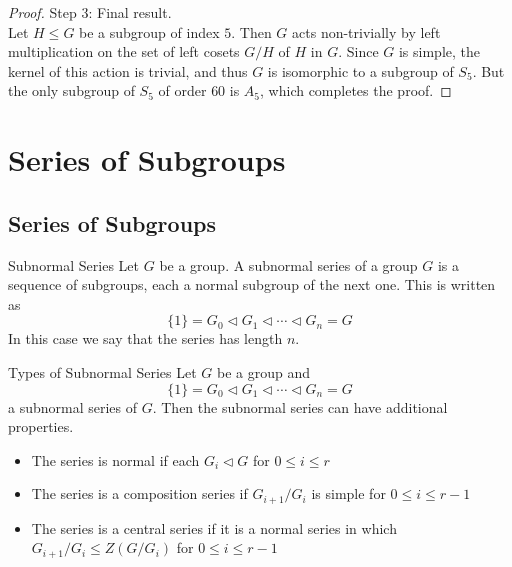 \documentclass[a4paper]{article}
\begin{document}
\begin{thm}{}{}
\begin{proof}
Step 3: Final result. \\
Let $H\leq G$ be a subgroup of index $5$. Then $G$ acts non-trivially by left multiplication on the set of left cosets $G/H$ of $H$ in $G$. Since $G$ is simple, the kernel of this action is trivial, and thus $G$ is isomorphic to a subgroup of $S_5$. But the only subgroup of $S_5$ of order $60$ is $A_5$, which completes the proof. 
\end{proof}
\end{thm}


\pagebreak
\section{Series of Subgroups}
\subsection{Series of Subgroups}
\begin{defn}{Subnormal Series}{} Let $G$ be a group. A subnormal series  of a group $G$ is a sequence of subgroups, each a normal subgroup of the next one. This is written as $$\{1\}=G_0\triangleleft G_1\triangleleft\cdots\triangleleft G_n=G$$ In this case we say that the series has length $n$. 
\end{defn}

\begin{defn}{Types of Subnormal Series}{} Let $G$ be a group and $$\{1\}=G_0\triangleleft G_1\triangleleft\cdots\triangleleft G_n=G$$ a subnormal series of $G$. Then the subnormal series can have additional properties. 
\begin{itemize}
\item The series is normal if each $G_i\triangleleft G$ for $0\leq i\leq r$
\item The series is a composition series if $G_{i+1}/G_i$ is simple for  $0\leq i\leq r-1$
\item The series is a central series if it is a normal series in which $G_{i+1}/G_i\leq Z(G/G_i)$ for  $0\leq i\leq r-1$
\end{itemize}
\end{defn}
\end{document}
